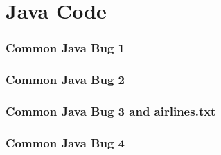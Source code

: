 %
%

\chapter{Java Code}\label{appa:code}


%
\subsection{Common Java Bug 1}


\subsection{Common Java Bug 2}


\subsection{Common Java Bug 3 and airlines.txt}




\subsection{Common Java Bug 4}



